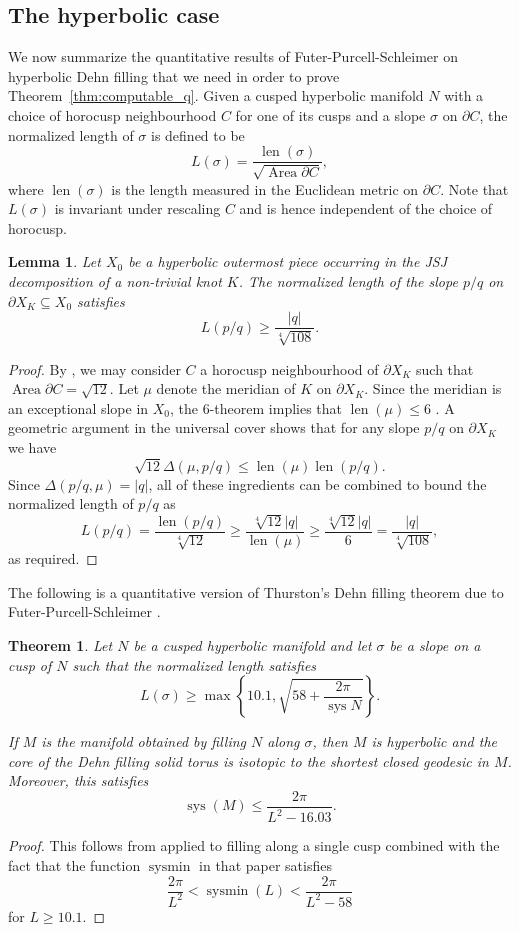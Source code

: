 \documentclass{amsart} %
\DeclareMathOperator{\sysmin}{sysmin}
\DeclareMathOperator{\sys}{sys}
\DeclareMathOperator{\len}{len}
\theoremstyle{thm}
\newtheorem{thm}[Theorem]{Theorem}
\newtheorem{lem}[Theorem]{Lemma}
\theoremstyle{definition}
\numberwithin{equation}{section}
\begin{document}
\subsection{The hyperbolic case}
We now summarize the quantitative results of Futer-Purcell-Schleimer on hyperbolic Dehn filling that we need in order to prove Theorem~\ref{thm:computable_q}. Given a cusped hyperbolic manifold $N$ with a choice of horocusp neighbourhood $C$ for one of its cusps and a slope $\sigma$ on $\partial C$, the normalized length of $\sigma$ is defined to be
\[
L(\sigma)=\frac{\len(\sigma)}{\sqrt{\operatorname{Area}\partial C}},
\]
where $\len(\sigma)$ is the length measured in the Euclidean metric on $\partial C$.
Note that $L(\sigma)$ is invariant under rescaling $C$ and is hence independent of the choice of horocusp.
\begin{lem}\label{lem:normalized_length_bound}
Let $X_0$ be a hyperbolic outermost piece occurring in the JSJ decomposition of a non-trivial knot $K$. The normalized length of the slope $p/q$ on $\partial X_K\subseteq X_0$ satisfies
\[
L(p/q) \geq\frac{|q|}{\sqrt[4]{108}}.
\]
\end{lem}
\begin{proof}
By \cite[Theorem~1.2]{Gabai_low_vol}, we may consider $C$ a horocusp neighbourhood of $\partial X_K$ such that $\operatorname{Area}\partial C=\sqrt{12}$. Let $\mu$ denote the meridian of $K$ on $\partial X_K$. Since the meridian is an exceptional slope in $X_0$, the 6-theorem implies that $\len(\mu)\leq 6$ \cite{Ag00, La00}. A geometric argument in the universal cover shows that for any slope $p/q$ on $\partial X_K$ we have
\[
\sqrt{12} \Delta(\mu,p/q) \leq \len(\mu) \len(p/q).
\]
Since $\Delta(p/q,\mu)=|q|$, all of these ingredients can be combined to bound the normalized length of $p/q$ as
\[
L(p/q) = \frac{\len(p/q)}{\sqrt[4]{12}}\geq \frac{\sqrt[4]{12} |q|}{\len(\mu)}\geq \frac{ \sqrt[4]{12}|q|}{6}=\frac{|q|}{\sqrt[4]{108}},
\]
as required.
\end{proof}

The following is a quantitative version of Thurston's Dehn filling theorem due to Futer-Purcell-Schleimer \cite{FPS19}.
\begin{thm}\label{thm:quantative_filling}
Let $N$ be a cusped hyperbolic manifold and let $\sigma$ be a slope on a cusp of $N$ such that the normalized length satisfies
\[
L(\sigma)\geq \max\left\{10.1, \sqrt{58 + \frac{2\pi}{\sys N}}  \right\}.
\]

If $M$ is the manifold obtained by filling $N$ along $\sigma$, then $M$ is hyperbolic and the core of the Dehn filling solid torus is isotopic to the shortest closed geodesic in $M$. Moreover, this satisfies
\[\sys(M)\leq \frac{2\pi}{L^2-16.03}.\]
\end{thm}\begin{proof}
    This follows from \cite[Theorem~7.28]{FPS19} applied to filling along a single cusp combined with the fact that the function $\sysmin$ in that paper satisfies
    \[
\frac{2\pi}{L^2}<\sysmin(L)<\frac{2\pi}{L^2-58}
\]
for $L\geq 10.1$.
\end{proof}
\end{document}
